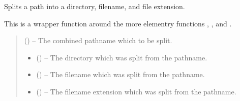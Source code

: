 \documentclass[letterpaper,11pt,english]{sphinxmanual}
\begin{document}

\begin{savenotes}\begin{fulllineitems}
\label{\detokenize{code/opihiexarata.library.path:opihiexarata.library.path.split_pathname}}
\pysigstartsignatures
{}
\pysigstopsignatures
\sphinxAtStartPar
Splits a path into a directory, filename, and file extension.

\sphinxAtStartPar
This is a wrapper function around the more elementry functions
, , and
.
\begin{quote}\begin{description}
\sphinxAtStartPar
{} () – The combined pathname which to be split.

\sphinxAtStartPar
\begin{itemize}
\item {} 
\sphinxAtStartPar
{} () – The directory which was split from the pathname.

\item {} 
\sphinxAtStartPar
{} () – The filename which was split from the pathname.

\item {} 
\sphinxAtStartPar
{} () – The filename extension which was split from the pathname.

\end{itemize}


\end{description}\end{quote}

\end{fulllineitems}\end{savenotes}
\end{document}
